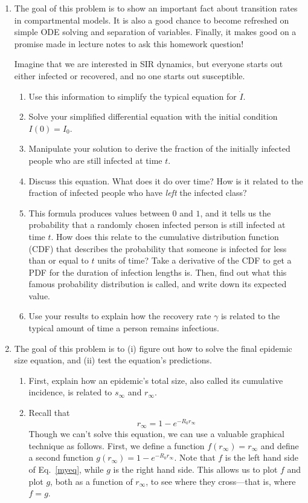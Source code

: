 \documentclass[11pt]{article}
\begin{document}
\begin{enumerate}
\clearpage

\item The goal of this problem is to show an important fact about transition rates in compartmental models. It is also a good chance to become refreshed on simple ODE solving and separation of variables. Finally, it makes good on a promise made in lecture notes to ask this homework question!
	
	Imagine that we are interested in SIR dynamics, but everyone starts out either infected or recovered, and no one starts out susceptible.
	\begin{enumerate}[label=\alph*.]
		\item Use this information to simplify the typical equation for $\dot{I}$.
		\item Solve your simplified differential equation with the initial condition $I(0) = I_0$.
		\item Manipulate your solution to derive the fraction of the initially infected people who are still infected at time $t$.
		\item Discuss this equation. What does it do over time? How is it related to the fraction of infected people who have {\it left} the infected class?
		\item This formula produces values between $0$ and $1$, and it tells us the probability that a randomly chosen infected person is still infected at time $t$. How does this relate to the cumulative distribution function (CDF) that describes the probability that someone is infected for less than or equal to $t$ units of time? Take a derivative of the CDF to get a PDF for the duration of infection lengths is. Then, find out what this famous probability distribution is called, and write down its expected value.
		\item Use your results to explain how the recovery rate $\gamma$ is related to the typical amount of time a person remains infectious.
	\end{enumerate}

\clearpage
\item The goal of this problem is to (i) figure out how to solve the final epidemic size equation, and (ii) test the equation's predictions.

	\begin{enumerate}[label=\alph*.]
		\item First, explain how an epidemic's total size, also called its cumulative incidence, is related to $s_\infty$ and $r_\infty$. 
		\item Recall that 
		\begin{equation}r_\infty = 1-e^{-R_0 r_\infty}\label{myeq}\end{equation} 
		Though we can't solve this equation, we can use a valuable graphical technique as follows. First, we define a function $f(r_\infty) = r_\infty$ and define a second function $g(r_\infty) = 1-e^{-R_0 r_\infty}$. Note that $f$ is the left hand side of Eq.~\eqref{myeq}, while $g$ is the right hand side. This allows us to plot $f$ and plot $g$, both as a function of $r_\infty$, to see where they cross---that is, where $f=g$. 
		

\end{enumerate}
\end{enumerate}
\end{document}
